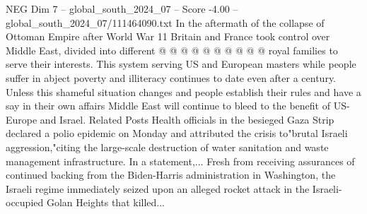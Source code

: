 \begin{textsample}{NEG Dim 7 – global\_south\_2024\_07 – Score -4.00 – global\_south\_2024\_07/111464090.txt}
In the aftermath of the collapse of Ottoman Empire after World War 11 Britain and France took control over Middle East, divided into different @ @ @ @ @ @ @ @ @ @ royal families to serve their interests.
This system serving US and European masters while people suffer in abject poverty and illiteracy continues to date even after a century.
Unless this shameful situation changes and people establish their rules and have a say in their own affairs Middle East will continue to bleed to the benefit of US-Europe and Israel.
Related Posts Health officials in the besieged Gaza Strip declared a polio epidemic on Monday and attributed the crisis to"brutal Israeli aggression,"citing the large-scale destruction of water sanitation and waste management infrastructure.
In a statement,...
Fresh from receiving assurances of continued backing from the Biden-Harris administration in Washington, the Israeli regime immediately seized upon an alleged rocket attack in the Israeli-occupied Golan Heights that killed...

\end{textsample}
